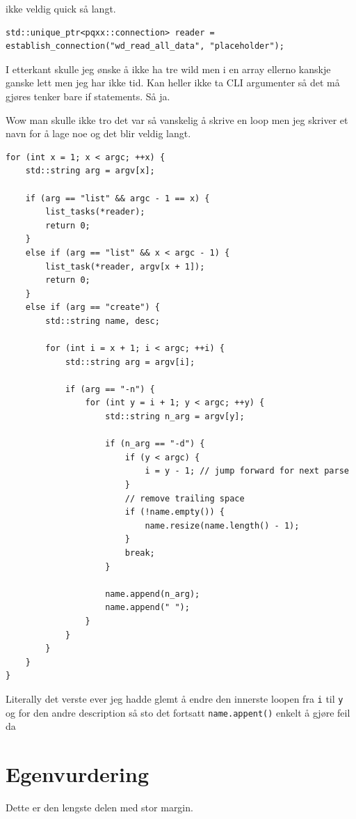 \documentclass{article}
\begin{document}
ikke veldig quick så langt.

\begin{lstlisting}
std::unique_ptr<pqxx::connection> reader = establish_connection("wd_read_all_data", "placeholder");
\end{lstlisting}

I etterkant skulle jeg ønske å ikke ha tre wild men i en array ellerno kanskje ganske lett men jeg har ikke tid.
Kan heller ikke ta CLI argumenter så det må gjøres tenker bare if statements. Så ja.

Wow man skulle ikke tro det var så vanskelig å skrive en loop men jeg skriver et navn for å lage noe og det blir veldig langt.
\begin{lstlisting}
for (int x = 1; x < argc; ++x) {
    std::string arg = argv[x];

    if (arg == "list" && argc - 1 == x) {
        list_tasks(*reader);
        return 0;
    } 
    else if (arg == "list" && x < argc - 1) {
        list_task(*reader, argv[x + 1]);
        return 0;
    } 
    else if (arg == "create") {
        std::string name, desc;

        for (int i = x + 1; i < argc; ++i) {
            std::string arg = argv[i];

            if (arg == "-n") {
                for (int y = i + 1; y < argc; ++y) {
                    std::string n_arg = argv[y];

                    if (n_arg == "-d") {
                        if (y < argc) {
                            i = y - 1; // jump forward for next parse
                        }
                        // remove trailing space
                        if (!name.empty()) {
                            name.resize(name.length() - 1);
                        }
                        break;
                    }

                    name.append(n_arg);
                    name.append(" ");
                }
            }
        }
    }
}

\end{lstlisting}
Literally det verste ever jeg hadde glemt å endre den innerste loopen fra \lstinline{i} til \lstinline{y} og for den andre description så sto det fortsatt \lstinline{name.appent()} enkelt å gjøre feil da

\section{Egenvurdering}
Dette er den lengste delen med stor margin.
\end{document}
